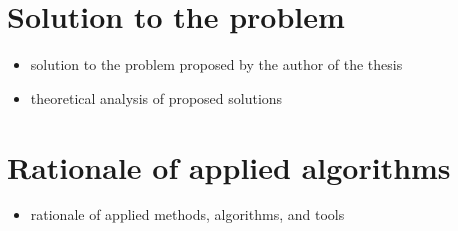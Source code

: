 \section{Solution to the problem}

\begin{itemize}
    \item solution to the problem proposed by the author of the thesis
    \item theoretical analysis of proposed solutions
\end{itemize}
    

\section{Rationale of applied algorithms}

\begin{itemize}
    \item rationale of applied methods, algorithms, and tools
\end{itemize}
